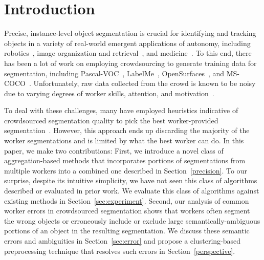 \vspace{-9pt}
\section{Introduction\label{sec:intro}}
Precise, instance-level object segmentation is crucial for identifying and tracking objects in a variety of real-world emergent applications of autonomy, including robotics~\cite{Natonek1998}, image organization and retrieval~\cite{Yamaguchi2012}, and medicine~\cite{Irshad2014}. To this end, there has been a lot of work on employing crowdsourcing to generate training data for segmentation, including Pascal-VOC~\cite{Everingham15}, LabelMe~\cite{Torralba2010}, OpenSurfaces~\cite{bell15minc}, and MS-COCO~\cite{Lin2012}. Unfortunately, raw data collected from the crowd is known to be noisy due to varying degrees of worker skills, attention, and motivation~\cite{bell14intrinsic,MDWWelinder2010}. 
\par To deal with these challenges, many have employed heuristics indicative of crowdsourced segmentation quality to pick the best worker-provided segmentation~\cite{Sorokin2008,Vittayakorn2011}. However, this approach ends up discarding the majority of the worker segmentations and is limited by what the best worker can do. In this paper, we make two contributions: First, we introduce a novel class of aggregation-based methods that incorporates portions of segmentations from multiple workers into a combined one described in Section~\ref{precision}. To our surprise, despite its intuitive simplicity, we have not seen this class of algorithms described or evaluated in prior work. We evaluate this class of algorithms against existing methods in Section~\ref{sec:experiment}. Second, our analysis of common worker errors in crowdsourced segmentation shows that workers often segment the wrong objects or erroneously include or exclude large semantically-ambiguous portions of an object in the resulting segmentation. We discuss these semantic errors and ambiguities in Section~\ref{sec:error} and propose a clustering-based preprocessing technique that resolves such errors in Section~\ref{perspective}.%
